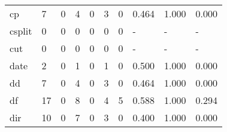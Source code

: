 \begin{longtable}{lp{2.0cm}p{2.0cm}p{2.0cm}p{2.0cm}p{2.0cm}p{2.0cm}p{2.0cm}p{2.0cm}p{2.0cm}}
cp        &                      7 &                                  0 &                                 4 &                                0 &                                 3 &                               0 &                                0.464 &                                  1.000 &                                0.000 \\
csplit    &                      0 &                                  0 &                                 0 &                                0 &                                 0 &                               0 &                                    - &                                      - &                                    - \\
cut       &                      0 &                                  0 &                                 0 &                                0 &                                 0 &                               0 &                                    - &                                      - &                                    - \\
date      &                      2 &                                  0 &                                 1 &                                0 &                                 1 &                               0 &                                0.500 &                                  1.000 &                                0.000 \\
dd        &                      7 &                                  0 &                                 4 &                                0 &                                 3 &                               0 &                                0.464 &                                  1.000 &                                0.000 \\
df        &                     17 &                                  0 &                                 8 &                                0 &                                 4 &                               5 &                                0.588 &                                  1.000 &                                0.294 \\
dir       &                     10 &                                  0 &                                 7 &                                0 &                                 3 &                               0 &                                0.400 &                                  1.000 &                                0.000 \\

\end{longtable}
